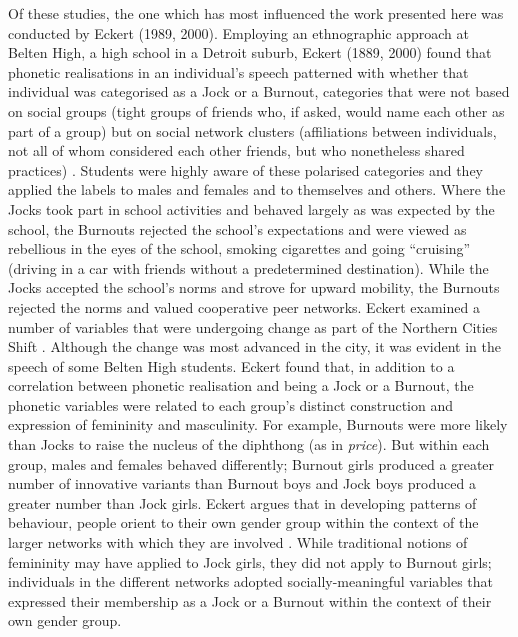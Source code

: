 Of these studies, the one which has most influenced the work presented here was conducted by Eckert (1989, 2000).  Employing an ethnographic approach at Belten High, a high school in a Detroit suburb, Eckert (1889, 2000) found that pho\-ne\-tic realisations in an individual's speech patterned with whe\-ther that individual was ca\-tegorised as a Jock or a Burnout, categories that were not based on social groups (tight groups of friends who, if asked, would name each other as part of a group) but on social network clusters (affiliations between individuals, not all of whom considered each other friends, but who nonetheless shared practices) \cite[11]{eckert2005}.  Students were highly aware of these polarised categories and they applied the labels to males and females and to themselves and others.  Where the Jocks took part in school activities and behaved largely as was expected by the school, the Burnouts rejected the school's expectations and were viewed as rebellious in the eyes of the school, smoking cigarettes and going ``cruising'' (driving in a car with friends without a predetermined destination).  While the Jocks accepted the school's norms and strove for upward mobility, the Burnouts rejected the norms and valued cooperative peer networks.  Eckert examined a number of variables that were undergoing change as part of the Northern Cities Shift \cite{labovyaegersteiner1972}. Although the change was most advanced in the city, it was evident in the speech of some Belten High students. Eckert found that, in addition to a correlation between phonetic realisation and being a Jock or a Burnout, the phonetic variables were related to each group's distinct construction and expression of femininity and masculinity.  For example, Burnouts were more likely than Jocks to raise the nucleus of the diphthong  (as in \textit{price}).  But within each group, males and females behaved differently; Burnout girls produced a greater number of innovative variants than Burnout boys and Jock boys produced a greater number than Jock girls.  Eckert argues that in developing patterns of behaviour, people orient to their own gender group within the context of the larger networks with which they are involved \cite[122-123]{eckert2000}.  While traditional notions of femininity may have applied to Jock girls, they did not apply to Burnout girls; individuals in the different networks adopted socially-meaningful variables that expressed their membership as a Jock or a Burnout within the  context of their own gender group.\nocite{eckert1989,eckert2000} 

